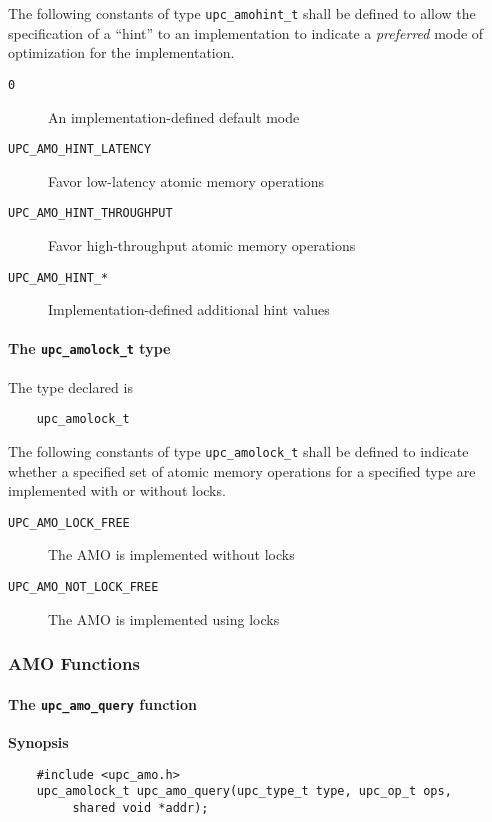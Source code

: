 \np The following constants of type {\tt upc\_amohint\_t} shall be defined
    to allow the specification of a ``hint'' to an implementation to indicate
    a \emph{preferred} mode of optimization for the implementation.
\begin{description}
  \item[{\tt 0}]
    An implementation-defined default mode
  \item[{\tt UPC\_AMO\_HINT\_LATENCY}]
    Favor low-latency atomic memory operations
  \item[{\tt UPC\_AMO\_HINT\_THROUGHPUT}]
    Favor high-throughput atomic memory operations
  \item[{\tt UPC\_AMO\_HINT\_*}]
    Implementation-defined additional hint values
\end{description}

\paragraph{The {\tt upc\_amolock\_t} type}

\npf The type declared is
\begin{verbatim}
    upc_amolock_t
\end{verbatim}

\np The following constants of type {\tt upc\_amolock\_t} shall be defined
    to indicate whether a specified set of atomic memory operations for a
    specified type are implemented with or without locks.
\begin{description}
  \item[{\tt UPC\_AMO\_LOCK\_FREE}]
    The AMO is implemented without locks
  \item[{\tt UPC\_AMO\_NOT\_LOCK\_FREE}]
    The AMO is implemented using locks
\end{description}

\subsubsection{AMO Functions}
\label{upc-amo-functions}

\paragraph{The {\tt upc\_amo\_query} function}

{\bf Synopsis}

\npf\vspace{-1.8em}
\begin{verbatim}
    #include <upc_amo.h>
    upc_amolock_t upc_amo_query(upc_type_t type, upc_op_t ops,
         shared void *addr);
\end{verbatim}

